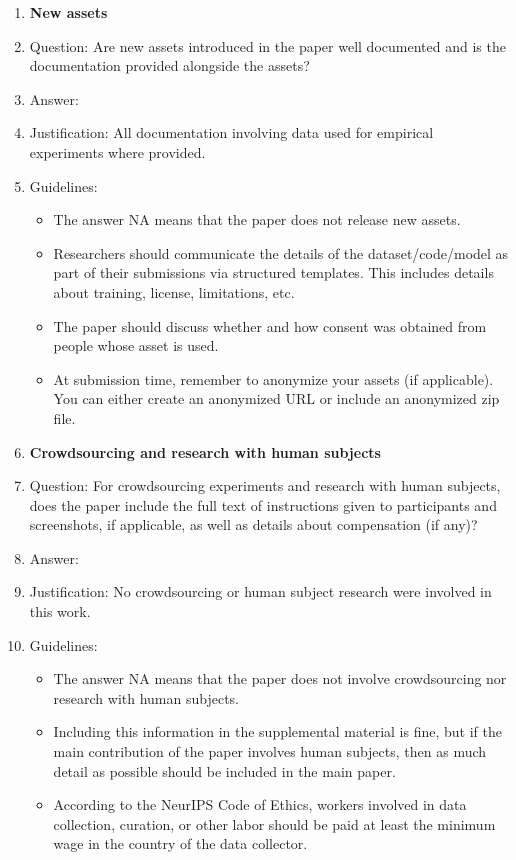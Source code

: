 \documentclass{article}
\theoremstyle{plain}
\theoremstyle{definition}
\theoremstyle{remark}
\begin{document}
\begin{enumerate}
\item {\bf New assets}
    \item[] Question: Are new assets introduced in the paper well documented and is the documentation provided alongside the assets?
    \item[] Answer: \answerYes{} %
    \item[] Justification: All documentation involving data used for empirical experiments where provided.
    \item[] Guidelines:
    \begin{itemize}
        \item The answer NA means that the paper does not release new assets.
        \item Researchers should communicate the details of the dataset/code/model as part of their submissions via structured templates. This includes details about training, license, limitations, etc. 
        \item The paper should discuss whether and how consent was obtained from people whose asset is used.
        \item At submission time, remember to anonymize your assets (if applicable). You can either create an anonymized URL or include an anonymized zip file.
    \end{itemize}

\item {\bf Crowdsourcing and research with human subjects}
    \item[] Question: For crowdsourcing experiments and research with human subjects, does the paper include the full text of instructions given to participants and screenshots, if applicable, as well as details about compensation (if any)? 
    \item[] Answer: \answerNA{} %
    \item[] Justification: No crowdsourcing or human subject research were involved in this work.
    \item[] Guidelines:
    \begin{itemize}
        \item The answer NA means that the paper does not involve crowdsourcing nor research with human subjects.
        \item Including this information in the supplemental material is fine, but if the main contribution of the paper involves human subjects, then as much detail as possible should be included in the main paper. 
        \item According to the NeurIPS Code of Ethics, workers involved in data collection, curation, or other labor should be paid at least the minimum wage in the country of the data collector. 
    \end{itemize}


\end{enumerate}
\end{document}
